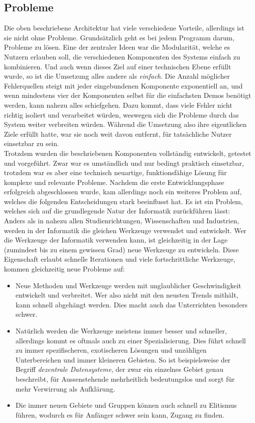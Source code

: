 \documentclass[a4paper,11pt,titlepage,twoside]{memoir}
\begin{document}
\subsection{Probleme}
\label{sec:orgf6f9a73}
Die oben beschriebene Architektur hat viele verschiedene Vorteile,
allerdings ist sie nicht ohne Probleme. Grundsätzlich geht es bei
jedem Programm darum, Probleme zu lösen. Eine der zentraler Ideen war
die Modularität, welche es Nutzern erlauben soll, die verschiedenen
Komponenten des Systems einfach zu kombinieren. Und auch wenn dieses
Ziel auf einer technischen Ebene erfüllt wurde, so ist die Umsetzung
alles andere als \emph{einfach}. Die Anzahl möglicher Fehlerquellen steigt
mit jeder eingebundenen Komponente exponentiell an, und wenn
mindestens vier der Komponenten selbst für die einfachsten Demos
benötigt werden, kann nahezu alles schiefgehen. Dazu kommt, dass viele
Fehler nicht richtig isoliert und verarbeitet würden, weswegen sich
die Probleme durch das System weiter verbreiten würden. Während die
Umsetzung also ihre eigentlichen Ziele erfüllt hatte, war sie noch
weit davon entfernt, für tatsächliche Nutzer einsetzbar zu sein.\\

\noindent Trotzdem wurden die beschriebenen Komponenten vollständig
entwickelt, getestet und vorgeführt. Zwar war es umständlich und nur
bedingt praktisch einsetzbar, trotzdem war es aber eine technisch
neuartige, funktionsfähige Lösung für komplexe und relevante Probleme.
Nachdem die erste Entwicklungsphase erfolgreich abgeschlossen wurde,
kam allerdings noch ein weiteres Problem auf, welches die folgenden
Entscheidungen stark beeinflusst hat. Es ist ein Problem, welches sich
auf die grundlegende Natur der Informatik zurückführen lässt:\\
Anders als in nahezu allen Studienrichtungen, Wissenschaften und
Industrien, werden in der Informatik die gleichen Werkzeuge verwendet
und entwickelt. Wer die Werkzeuge der Informatik verwenden kann, ist
gleichzeitig in der Lage (zumindest bis zu einem gewissen Grad) neue
Werkzeuge zu entwickeln. Diese Eigenschaft erlaubt schnelle
Iterationen und viele fortschrittliche Werkzeuge, kommen gleichzeitig
neue Probleme auf:
\begin{itemize}
\item Neue Methoden und Werkzeuge werden mit unglaublicher Geschwindigkeit
entwickelt und verbreitet. Wer also nicht mit den neusten Trends
mithält, kann schnell abgehängt werden. Dies macht auch das
Unterrichten besonders schwer.
\item Natürlich werden die Werkzeuge meistens immer besser und schneller,
allerdings kommt es oftmals auch zu einer Spezialisierung. Dies
führt schnell zu immer spezifischeren, exotischeren Lösungen und
unzähligen Unterbereichen und immer kleineren Gebieten. So ist
beispielsweise der Begriff \emph{dezentrale Datensysteme}, der zwar ein
einzelnes Gebiet genau beschreibt, für Aussenstehende mehrheitlich
bedeutungslos und sorgt für mehr Verwirrung als Aufklärung.
\item Die immer neuen Gebiete und Gruppen können auch schnell zu Elitismus
führen, wodurch es für Anfänger schwer sein kann, Zugang zu finden.
\end{itemize}
\end{document}
